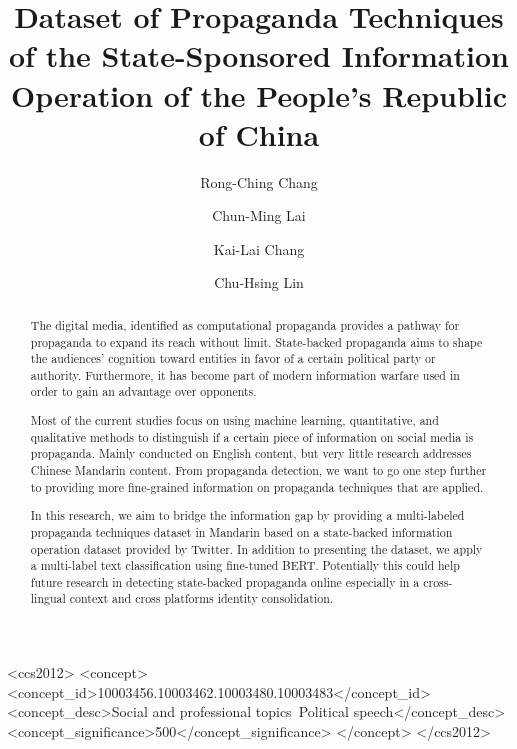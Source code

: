 \documentclass[sigconf]{acmart}
\begin{document}
\title{
Dataset of Propaganda Techniques of the State-Sponsored Information Operation of the People's Republic of China}

\author{Rong-Ching Chang}
\author{Chun-Ming Lai}

\author{Kai-Lai Chang}

\author{Chu-Hsing Lin}




\renewcommand{\shortauthors}{Chang, Lai, et al.}

\begin{abstract}

The digital media, identified as computational propaganda provides a pathway for propaganda to expand its reach without limit. State-backed propaganda aims to shape the audiences’ cognition toward entities in favor of a certain political party or authority. Furthermore, it has become part of modern information warfare used in order to gain an advantage over opponents.

Most of the current studies focus on using machine learning, quantitative, and qualitative methods to distinguish if a certain piece of information on social media is propaganda. Mainly conducted on English content, but very little research addresses Chinese Mandarin content. From propaganda detection, we want to go one step further to providing more fine-grained information on propaganda techniques that are applied.

In this research, we aim to bridge the information gap by providing a multi-labeled propaganda techniques dataset in Mandarin based on a state-backed information operation dataset provided by Twitter.
In addition to presenting the dataset, we apply a multi-label text classification using fine-tuned BERT. Potentially this could help future research in detecting state-backed propaganda online especially in a cross-lingual context and cross platforms identity consolidation.


\end{abstract}

\begin{CCSXML}
<ccs2012>
   <concept>
       <concept_id>10003456.10003462.10003480.10003483</concept_id>
       <concept_desc>Social and professional topics~Political speech</concept_desc>
       <concept_significance>500</concept_significance>
       </concept>
 </ccs2012>
\end{CCSXML}
\end{document}
